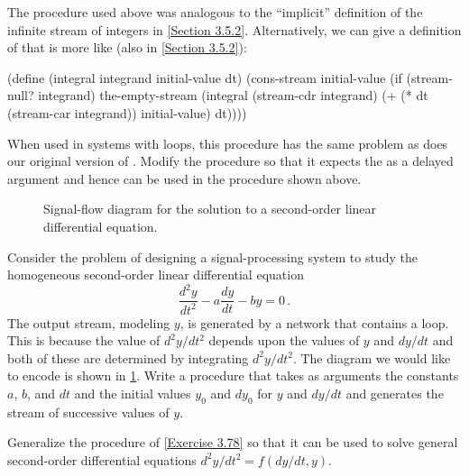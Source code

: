 \begin{exercise}
	\label{Exercise 3.77}
	The  procedure used above was analogous to the “implicit” definition of the infinite stream of integers in \cref{Section 3.5.2}.
	Alternatively, we can give a definition of  that is more like  (also in \cref{Section 3.5.2}):
	\begin{smallscheme}
	  (define (integral integrand initial-value dt)
	    (cons-stream
	     initial-value
	     (if (stream-null? integrand)
	         the-empty-stream
	         (integral (stream-cdr integrand)
	                   (+ (* dt (stream-car integrand))
	                      initial-value)
	                   dt))))
	\end{smallscheme}
	When used in systems with loops, this procedure has the same problem as does our original version of .
	Modify the procedure so that it expects the  as a delayed argument and hence can be used in the  procedure shown above.
\end{exercise}



\begin{figure}[tb]
	\centering
	
	\caption{
		Signal-flow diagram for the solution to a second-order linear differential equation.
	}
	\label{Figure 3.35}
\end{figure}



\begin{exercise}
	\label{Exercise 3.78}
	Consider the problem of designing a signal-processing system to study the homogeneous second-order linear differential equation
	\[
		\frac{d^2 y}{d t^2} - a \frac{d y}{d t} - b y = 0 \,.
	\]
	The output stream, modeling \( y \), is generated by a network that contains a loop.
	This is because the value of \( d^2 y / d t^2 \) depends upon the values of \( y \) and \( dy / dt \) and both of these are determined by integrating \( d^2 y / dt^2 \).
	The diagram we would like to encode is shown in \cref{Figure 3.35}.
	Write a procedure  that takes as arguments the constants \( a \), \( b \), and \( dt \) and the initial values \( y_0 \) and \( dy_0 \) for \( y \) and \( dy / dt \) and generates the stream of successive values of \( y \).
\end{exercise}



\begin{exercise}
	\label{Exercise 3.79}
	Generalize the  procedure of \cref{Exercise 3.78} so that it can be used to solve general second-order differential equations \( d^2 y / d t^2 = f(dy / dt, y) \).
\end{exercise}



